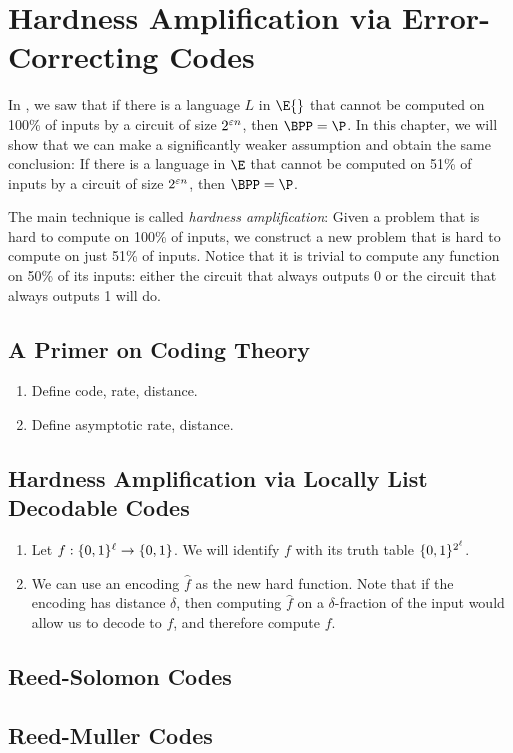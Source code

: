 \chapter{Hardness Amplification via Error-Correcting Codes}
\label{lec:03}

In , we saw that if there is a language $L$ in $\E{}$ that cannot be computed on 100\% of inputs by a
circuit of size $2^{\varepsilon n}$, then $\BPP = \P$.
In this chapter, we will show that we can make a significantly weaker assumption and obtain the same conclusion: If
there is a language in $\E$ that cannot be computed on 51\% of inputs by a circuit of size $2^{\varepsilon n}$, then $\BPP =
\P$.

The main technique is called \emph{hardness amplification}: Given a problem that is hard to compute on 100\% of inputs,
we construct a new problem that is hard to compute on just 51\% of inputs.
Notice that it is trivial to compute any function on 50\% of its inputs: either the circuit that always outputs 0 or the
circuit that always outputs 1 will do.


\section{A Primer on Coding Theory}

\begin{enumerate}
    \item Define code, rate, distance.
    \item Define asymptotic rate, distance.
\end{enumerate}

\section{Hardness Amplification via Locally List Decodable Codes}

\begin{enumerate}
    \item Let $f : \{0, 1\}^\ell \to \{0, 1\}$. We will identify $f$ with its truth table $\{0, 1\}^{2^\ell}$.
    \item We can use an encoding $\hat{f}$ as the new hard function. Note that if the encoding has distance $\delta$, then computing $\hat{f}$ on a $\delta$-fraction of the input would allow us to decode to $f$, and therefore compute $f$.
\end{enumerate}

\section{Reed-Solomon Codes}

\section{Reed-Muller Codes}
